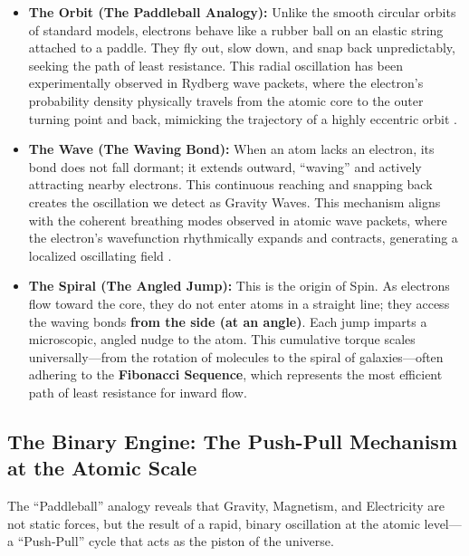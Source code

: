 \documentclass[11pt, a4paper]{article}
\begin{document}
\begin{itemize}
  \item \textbf{The Orbit (The Paddleball Analogy):} Unlike the smooth circular orbits of standard models, electrons behave like a rubber ball on an elastic string attached to a paddle. They fly out, slow down, and snap back unpredictably, seeking the path of least resistance. This radial oscillation has been experimentally observed in Rydberg wave packets, where the electron's probability density physically travels from the atomic core to the outer turning point and back, mimicking the trajectory of a highly eccentric orbit \cite{chen1999}.
  
  \item \textbf{The Wave (The Waving Bond):} When an atom lacks an electron, its bond does not fall dormant; it extends outward, ``waving'' and actively attracting nearby electrons. This continuous reaching and snapping back creates the oscillation we detect as Gravity Waves. This mechanism aligns with the coherent breathing modes observed in atomic wave packets, where the electron's wavefunction rhythmically expands and contracts, generating a localized oscillating field \cite{chen1999}.
  
  \item \textbf{The Spiral (The Angled Jump):} This is the origin of Spin. As electrons flow toward the core, they do not enter atoms in a straight line; they access the waving bonds \textbf{from the side (at an angle)}. Each jump imparts a microscopic, angled nudge to the atom. This cumulative torque scales universally—from the rotation of molecules to the spiral of galaxies—often adhering to the \textbf{Fibonacci Sequence}, which represents the most efficient path of least resistance for inward flow.
\end{itemize}

\subsection{The Binary Engine: The Push-Pull Mechanism at the Atomic Scale}

The ``Paddleball'' analogy reveals that Gravity, Magnetism, and Electricity are not static forces, but the result of a rapid, binary oscillation at the atomic level—a ``Push-Pull'' cycle that acts as the piston of the universe.
\end{document}
